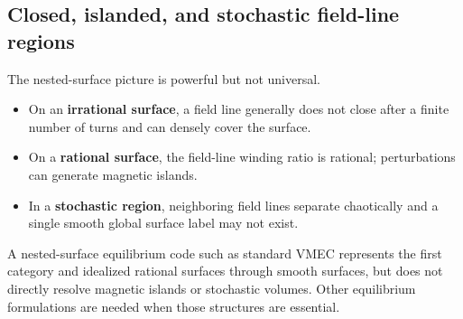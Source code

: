 \subsection{Closed, islanded, and stochastic field-line regions}
The nested-surface picture is powerful but not universal.
\begin{itemize}[leftmargin=1.6em]
\item On an \textbf{irrational surface}, a field line generally does not close after a finite number of turns and can densely cover the surface.
\item On a \textbf{rational surface}, the field-line winding ratio is rational; perturbations can generate magnetic islands.
\item In a \textbf{stochastic region}, neighboring field lines separate chaotically and a single smooth global surface label may not exist.
\end{itemize}
A nested-surface equilibrium code such as standard VMEC represents the first category and idealized rational surfaces through smooth surfaces, but does not directly resolve magnetic islands or stochastic volumes. Other equilibrium formulations are needed when those structures are essential.

